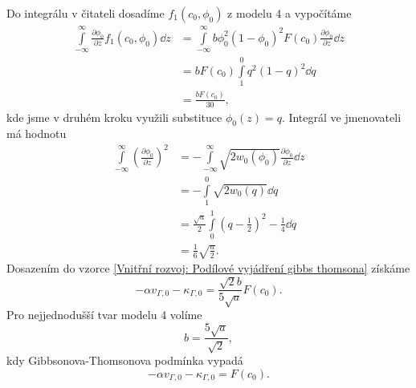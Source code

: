 \begin{itemize}
\begin{equation}
    \end{equation}
    Do integrálu v čitateli dosadíme \(f_1(c_0, \phi_0)\) z modelu 4 a vypočítáme
    \begin{equation}
        \begin{split}
            \int\limits_{-\infty}^{\infty}\frac{\partial \phi_0}{\partial z}f_1(c_0, \phi_0) \dd z &= \int\limits_{-\infty}^{\infty} b\phi_0^2 (1-\phi_0)^2 F(c_0) \frac{\partial \phi_0}{\partial z} \dd z\\ &= bF(c_0)\int\limits_{1}^{0}q^2(1-q)^2 \dd q\\ &= \frac{b F(c_0)}{30},
        \end{split}
    \end{equation}
    kde jsme v druhém kroku využili substituce \(\phi_0(z) = q\).
    Integrál ve jmenovateli má hodnotu
    \begin{equation}
        \begin{split}
            \int\limits_{-\infty}^{\infty} \left(\frac{\partial \phi_0}{\partial z}\right)^2
            &= - \int\limits_{-\infty}^{\infty}\sqrt{2w_0(\phi_0)}\frac{\partial \phi_0}{\partial z} \dd z\\
            &= -\int\limits_{1}^{0}\sqrt{2w_0(q)} \dd q\\
            &= \frac{\sqrt{a}}{2} \int\limits_{0}^{1} \left(q-\frac{1}{2}\right)^2 - \frac{1}{4} \dd q \\
            &= \frac{1}{6}\sqrt{\frac{a}{2}}.
        \end{split}
    \end{equation}
    Dosazením do vzorce \eqref{Vnitřní rozvoj: Podílové vyjádření gibbs thomsona} získáme
    \begin{equation}
        -\alpha v_{\Gamma,0} - \kappa_{\Gamma, 0} = \frac{\sqrt{2}b }{5\sqrt{a}}F(c_0).
    \end{equation}
    Pro nejjednodušší tvar modelu 4 volíme
    \begin{equation}
        b = \frac{5\sqrt{a}}{\sqrt{2}},
    \end{equation}
    kdy Gibbsonova-Thomsonova podmínka vypadá
    \begin{equation}
        -\alpha v_{\Gamma,0} - \kappa_{\Gamma, 0} = F(c_0).
    \end{equation}
    
\end{itemize}


